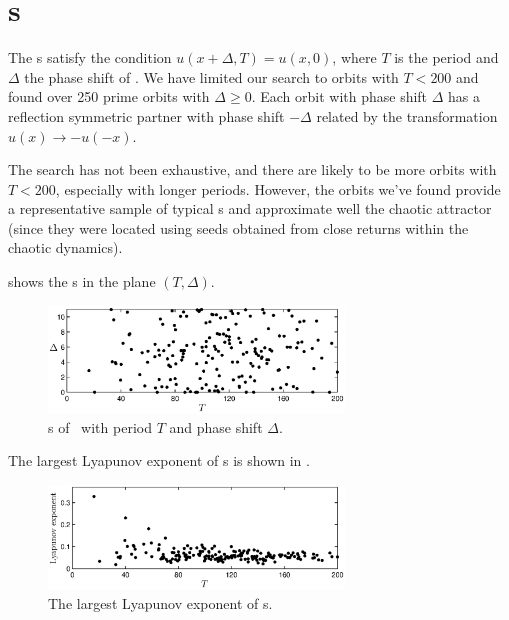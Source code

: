 %

\section{\Rpo s}

The \rpo s satisfy the condition $u(x+\Delta,T) = u(x,0)$, where $T$
is the period and $\Delta$ the phase shift of \rpo .  We have
limited our search to orbits with $T < 200$ and found over 250 prime
orbits with $\Delta \ge 0$.  Each orbit with phase shift $\Delta$
has a reflection symmetric partner with phase shift $-\Delta$
related by the transformation $u(x) \to -u(-x)$.

The search has not been exhaustive, and there are likely to be more
orbits with $T < 200$, especially with longer periods.  However, the
orbits we've found provide a representative sample of typical \rpo s
and approximate well the chaotic attractor (since they were located
using seeds obtained from close returns within the chaotic
dynamics).

 shows the \rpo s in the plane $(T,\Delta)$.
\begin{figure}[t]
\begin{center}
\includegraphics[width=0.7\textwidth]{figs/ks22_rpos_Tdelta.eps}
\end{center}
\caption{\Rpo s of \KSe\ with period $T$ and phase shift $\Delta$.
        } \label{f:ks22rposT}
\end{figure}

The largest Lyapunov exponent of \rpo s is shown in
.

\begin{figure}[t]
\begin{center}
\includegraphics[width=0.7\textwidth]{figs/ks22_rpos_lyap.eps}
\end{center}
\caption{The largest Lyapunov exponent of \rpo s.
        } \label{f:ks22rposL}
\end{figure}

